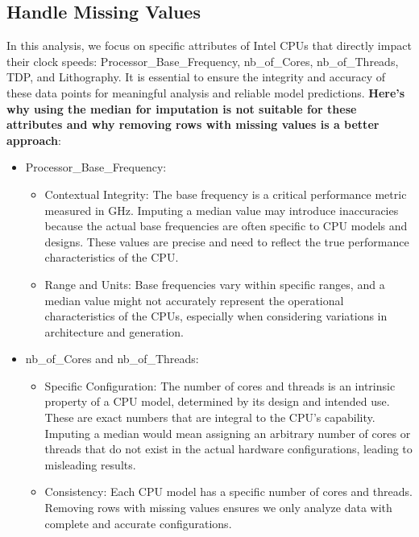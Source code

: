 \subsection{Handle Missing Values}

In this analysis, we focus on specific attributes of Intel CPUs that directly impact their clock speeds: Processor\_Base\_Frequency, nb\_of\_Cores, nb\_of\_Threads, TDP, and Lithography. It is essential to ensure the integrity and accuracy of these data points for meaningful analysis and reliable model predictions. \textbf{Here's why using the median for imputation is not suitable for these attributes and why removing rows with missing values is a better approach}:

\begin{itemize}
    \item Processor\_Base\_Frequency:
    \begin{itemize}
        \item Contextual Integrity: The base frequency is a critical performance metric measured in GHz. Imputing a median value may introduce inaccuracies because the actual base frequencies are often specific to CPU models and designs. These values are precise and need to reflect the true performance characteristics of the CPU.
        \item Range and Units: Base frequencies vary within specific ranges, and a median value might not accurately represent the operational characteristics of the CPUs, especially when considering variations in architecture and generation.
    \end{itemize}

    \item nb\_of\_Cores and nb\_of\_Threads:
    \begin{itemize}
        \item Specific Configuration: The number of cores and threads is an intrinsic property of a CPU model, determined by its design and intended use. These are exact numbers that are integral to the CPU's capability. Imputing a median would mean assigning an arbitrary number of cores or threads that do not exist in the actual hardware configurations, leading to misleading results.
        \item Consistency: Each CPU model has a specific number of cores and threads. Removing rows with missing values ensures we only analyze data with complete and accurate configurations.
    \end{itemize}


\end{itemize}
